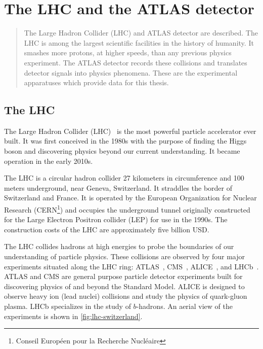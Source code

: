 \chapter[The LHC and the ATLAS detector][The LHC and the ATLAS detector]{The LHC and the ATLAS detector}
\label{chap:lhcatlas}

\begin{quote}
  The Large Hadron Collider (LHC) and ATLAS detector are described. The LHC is among the largest scientific facilities in the history of humanity. It smashes more protons, at higher speeds, than any previous physics experiment. The ATLAS detector records these collisions and translates detector signals into physics phenomena. These are the experimental apparatuses which provide data for this thesis.
\end{quote}
 
\section{The LHC}
\label{sec:lhc}

The Large Hadron Collider (LHC)~\cite{cern-jinst-lhc} is the most powerful particle accelerator ever built. It was first conceived in the 1980s with the purpose of finding the Higgs boson and discovering physics beyond our current understanding. It became operation in the early 2010s.

The LHC is a circular hadron collider 27 kilometers in circumference and 100 meters underground, near Geneva, Switzerland. It straddles the border of Switzerland and France. It is operated by the European Organization for Nuclear Research (CERN\footnote{Conseil Europ\'een pour la Recherche Nucl\'eaire}) and occupies the underground tunnel originally constructed for the Large Electron Positron collider (LEP) for use in the 1990s. The construction costs of the LHC are approximately five billion USD.

The LHC collides hadrons at high energies to probe the boundaries of our understanding of particle physics. These collisions are observed by four major experiments situated along the LHC ring: ATLAS~\cite{cern-jinst-atlas}, CMS~\cite{cern-jinst-cms}, ALICE~\cite{cern-jinst-alice}, and LHCb~\cite{cern-jinst-lhcb}. ATLAS and CMS are general purpose particle detector experiments built for discovering physics of and beyond the Standard Model. ALICE is designed to observe heavy ion (lead nuclei) collisions and study the physics of quark-gluon plasma. LHCb specializes in the study of $b$-hadrons. An aerial view of the experiments is shown in \cref{fig:lhc-switzerland}.

